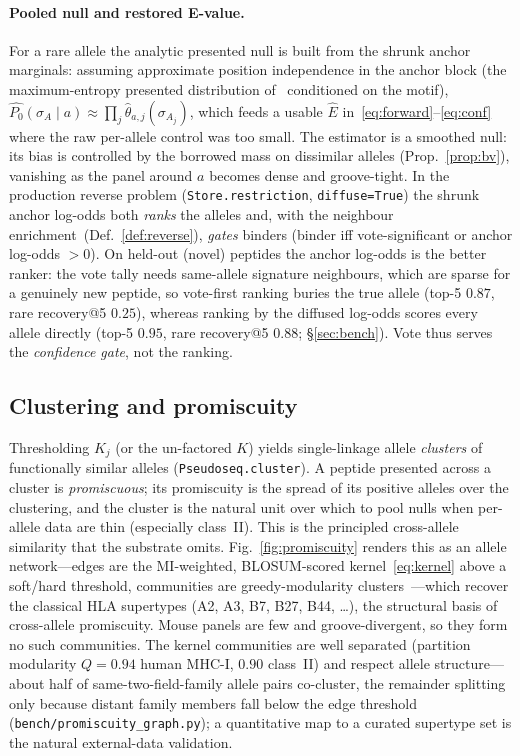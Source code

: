 \documentclass[11pt]{article}
\theoremstyle{oldplain}
\theoremstyle{oldrem}
\newcommand{\Pzero}{P_{0}}
\begin{document}
\paragraph{Pooled null and restored E-value.} For a rare allele the analytic presented null is built
from the shrunk anchor marginals: assuming approximate position independence in the anchor block
(the maximum-entropy presented distribution of~\cite{TiffeauMayer2026} conditioned on the motif),
$\widehat{\Pzero}(\sigma_A\mid a)\approx\prod_{j}\hat\theta_{a,j}(\sigma_{A_j})$, which feeds a usable
$\widehat E$ in~\eqref{eq:forward}--\eqref{eq:conf} where the raw per-allele control was too small.
The estimator is a smoothed null: its bias is controlled by the borrowed mass on dissimilar alleles
(Prop.~\ref{prop:bv}), vanishing as the panel around $a$ becomes dense and groove-tight. In the
production reverse problem (\texttt{Store.restriction}, \texttt{diffuse=True}) the shrunk anchor
log-odds both \emph{ranks} the alleles and, with the neighbour enrichment~(Def.~\ref{def:reverse}),
\emph{gates} binders (binder iff vote-significant or anchor log-odds $>0$). On held-out (novel)
peptides the anchor log-odds is the better ranker: the vote tally needs same-allele signature
neighbours, which are sparse for a genuinely new peptide, so vote-first ranking buries the true
allele (top-5 $0.87$, rare recovery@5 $0.25$), whereas ranking by the diffused log-odds scores every
allele directly (top-5 $0.95$, rare recovery@5 $0.88$; \S\ref{sec:bench}). Vote thus serves the
\emph{confidence gate}, not the ranking.

\subsection{Clustering and promiscuity}
Thresholding $K_j$ (or the un-factored $K$) yields single-linkage allele \emph{clusters} of
functionally similar alleles (\texttt{Pseudoseq.cluster}). A peptide presented across a cluster is
\emph{promiscuous}; its promiscuity is the spread of its positive alleles over the clustering, and
the cluster is the natural unit over which to pool nulls when per-allele data are thin (especially
class~II). This is the principled cross-allele similarity that the substrate omits.
Fig.~\ref{fig:promiscuity} renders this as an allele network---edges are the MI-weighted,
BLOSUM-scored kernel~\eqref{eq:kernel} above a soft/hard threshold, communities are greedy-modularity
clusters~\cite{Clauset2004}---which recover the classical HLA supertypes (A2, A3, B7, B27, B44, \dots), the
structural basis of cross-allele promiscuity. Mouse panels are few and groove-divergent, so they
form no such communities. The kernel communities are well separated (partition modularity $Q=0.94$
human MHC-I, $0.90$ class~II) and respect allele structure---about half of same-two-field-family
allele pairs co-cluster, the remainder splitting only because distant family members fall below the
edge threshold (\texttt{bench/promiscuity\_graph.py}); a quantitative map to a curated supertype set
is the natural external-data validation.
\end{document}
